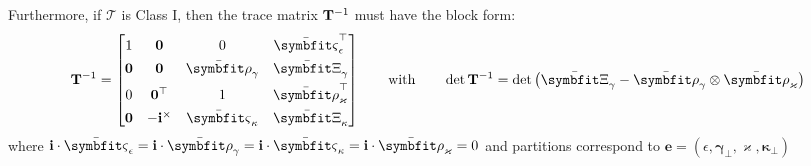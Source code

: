 Furthermore, if $\mathcal T$ is Class I, then the trace matrix
${\mathbf{T}^{-1}}$ must have the block form:
\begin{equation}
\TraceDeDpRoot = \begin{bmatrix}
1 & \mathbf{0} %
& 0 & \TraceNF^\top \\[4pt]
\mathbf{0} & \mathbf{0} & \TraceFT & \TraceFF \\[4pt] 
0 & \mathbf{0}^\top & 1 & \TraceTF^\top \\[4pt]
\mathbf{0} & -\FrameBasis^\times & \TraceBT & \TraceMF
\end{bmatrix}
\qquad\text{with}\qquad 
\operatorname{det}\TraceDeDpRoot = \operatorname{det}\left(\TraceFF - \TraceFT\otimes\TraceTF\right)
\label{eq:T0-plane-structure}
\end{equation}
where \(\FrameBasis\cdot\TraceNF = \FrameBasis\cdot\TraceFT = \FrameBasis\cdot\TraceBT = \FrameBasis\cdot\TraceTF = 0\) and partitions correspond to 
$\bm{e} = (\epsilon, \bm{\gamma}_\perp, \varkappa, \bm{\kappa}_\perp)$ 
